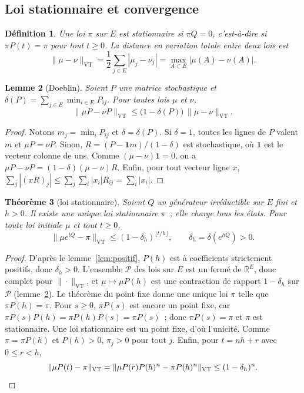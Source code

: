 \documentclass[10pt,a4paper,twocolumn]{article}
\theoremstyle{enonce}
\newtheorem{theoreme}{Théorème}[section]
\newtheorem{lemme}[theoreme]{Lemme}
\theoremstyle{defi}
\newtheorem{definition}[theoreme]{Définition}
\newcommand{\VT}{\mathrm{VT}}
\newcommand{\un}{\mathbf{1}}
\begin{document}
\subsection{Loi stationnaire et convergence}

\begin{definition}
Une loi $\pi$ sur $E$ est \emph{stationnaire} si $\pi Q=0$, c'est-à-dire si $\pi P(t)=\pi$ pour tout $t\geq0$. La distance en variation totale entre deux lois est
\[
\|\mu-\nu\|_\VT=\frac12\sum_{j\in E}|\mu_j-\nu_j|=\max_{A\subset E}|\mu(A)-\nu(A)|.
\]
\end{definition}

\begin{lemme}[Doeblin]\label{lem:doeblin}
Soient $P$ une matrice stochastique et $\delta(P)=\sum_{j\in E}\min_{i\in E}P_{ij}$. Pour toutes lois $\mu$ et $\nu$,
\[
\|\mu P-\nu P\|_\VT\leq\big(1-\delta(P)\big)\,\|\mu-\nu\|_\VT.
\]
\end{lemme}

\begin{proof}
Notons $m_j=\min_iP_{ij}$ et $\delta=\delta(P)$. Si $\delta=1$, toutes les lignes de $P$ valent $m$ et $\mu P=\nu P$. Sinon, $R=(P-\un m)/(1-\delta)$ est stochastique, où $\un$ est le vecteur colonne de uns. Comme $(\mu-\nu)\un=0$, on a $\mu P-\nu P=(1-\delta)(\mu-\nu)R$. Enfin, pour tout vecteur ligne $x$, $\sum_j|(xR)_j|\leq\sum_j\sum_i|x_i|R_{ij}=\sum_i|x_i|$.
\end{proof}

\begin{theoreme}[loi stationnaire]\label{thm:stationnaire}
Soient $Q$ un générateur irréductible sur $E$ fini et $h>0$. Il existe une unique loi stationnaire $\pi$~; elle charge tous les états. Pour toute loi initiale $\mu$ et tout $t\geq0$,
\[
\|\mu e^{tQ}-\pi\|_\VT\leq(1-\delta_h)^{\lfloor t/h\rfloor},\qquad \delta_h=\delta(e^{hQ})>0.
\]
\end{theoreme}

\begin{proof}
D'après le lemme~\ref{lem:positif}, $P(h)$ est à coefficients strictement positifs, donc $\delta_h>0$. L'ensemble $\mathcal{P}$ des lois sur $E$ est un fermé de $\mathbb{R}^E$, donc complet pour $\|\cdot\|_\VT$, et $\mu\mapsto\mu P(h)$ est une contraction de rapport $1-\delta_h$ sur $\mathcal{P}$ (lemme~\ref{lem:doeblin}). Le théorème du point fixe donne une unique loi $\pi$ telle que $\pi P(h)=\pi$. Pour $s\geq0$, $\pi P(s)$ est encore un point fixe, car $\pi P(s)P(h)=\pi P(h)P(s)=\pi P(s)$~; donc $\pi P(s)=\pi$ et $\pi$ est stationnaire. Une loi stationnaire est un point fixe, d'où l'unicité. Comme $\pi=\pi P(h)$ et $P(h)>0$, $\pi_j>0$ pour tout $j$. Enfin, pour $t=nh+r$ avec $0\leq r<h$,
\[
\|\mu P(t)-\pi\|_\VT=\|\mu P(r)P(h)^n-\pi P(h)^n\|_\VT\leq(1-\delta_h)^n.\qedhere
\]
\end{proof}
\end{document}
